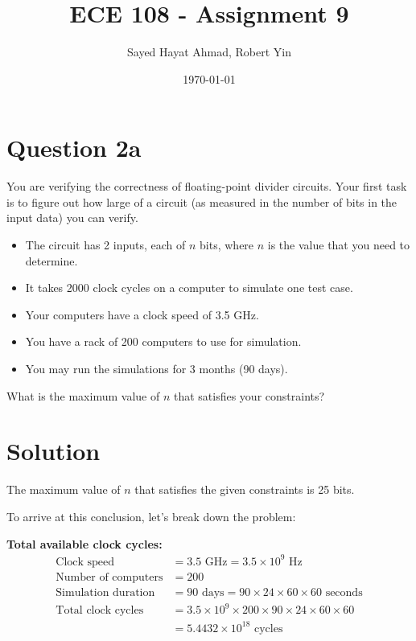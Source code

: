 \documentclass{article}
\title{ECE 108 - Assignment 9}
\author{Sayed Hayat Ahmad, Robert Yin}
\date{\today}
\begin{document}
\maketitle

\section*{Question 2a}

You are verifying the correctness of floating-point divider circuits.  Your first task is to figure out how large of a circuit (as measured in the number of bits in the input data) you can verify.

\begin{itemize}
    \item The circuit has 2 inputs, each of $n$ bits, where $n$ is the value that you need to determine.
    
    \item It takes 2000 clock cycles on a computer to simulate one test case.
    
    \item Your computers have a clock speed of 3.5 GHz.
    
    \item You have a rack of 200 computers to use for simulation.
    
    \item You may run the simulations for 3 months (90 days).
\end{itemize}

What is the maximum value of $n$ that satisfies your constraints?

\section*{Solution}
The maximum value of $n$ that satisfies the given constraints is 25 bits.

To arrive at this conclusion, let's break down the problem:

\textbf{Total available clock cycles:}
\begin{align*}
\text{Clock speed} &= 3.5 \text{ GHz} = 3.5 \times 10^9 \text{ Hz} \\
\text{Number of computers} &= 200 \\
\text{Simulation duration} &= 90 \text{ days} = 90 \times 24 \times 60 \times 60 \text{ seconds} \\
\text{Total clock cycles} &= 3.5 \times 10^9 \times 200 \times 90 \times 24 \times 60 \times 60 \\
&= 5.4432 \times 10^{18} \text{ cycles}
\end{align*}
\end{document}
